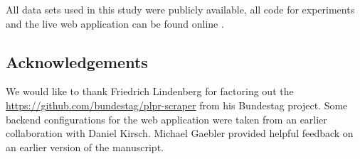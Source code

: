 \documentclass{article}
\begin{document}
All data sets used in this study were publicly available, all code for experiments and the live web application can be found online \cite{fipi, fipidemo}.

\subsection*{Acknowledgements}
We would like to thank Friedrich Lindenberg for factoring out the \url{https://github.com/bundestag/plpr-scraper} from his Bundestag project. Some backend configurations for the web application were taken from an earlier collaboration with Daniel Kirsch. Michael Gaebler provided helpful feedback on an earlier version of the manuscript. 
%
\small{


}
\end{document}

